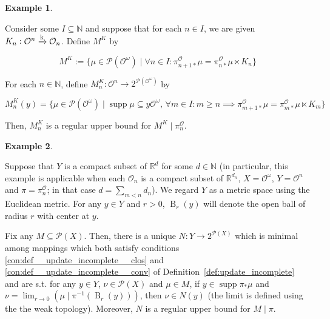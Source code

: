 \documentclass[11pt]{article}
\theoremstyle{definition}
\newtheorem{example}{Example}%
\theoremstyle{plain}
\newcommand{\Nats}{\mathbb{N}}
\newcommand{\Reals}{\mathbb{R}}
\newcommand{\B}{\operatorname{B}}
\newcommand{\M}{\xrightarrow{\textnormal{k}}}
\newcommand{\PM}{\mathcal{P}}
\DeclareMathOperator{\Sp}{supp}
\newcommand{\Ob}{\mathcal{O}}
\newcommand{\OO}{\Ob^\omega}
\newcommand{\PO}{\pi^\Ob}
\newcommand{\PMO}{\PM(\OO)}
\begin{document}
%
\begin{samepage}
\begin{example}
\label{exm:update_incomplete_kernels}

Consider some $I \subseteq \Nats$ and suppose that for each $n \in I$, we are given $K_n: \Ob^n \M \Ob_n$. Define $M^K$ by

\begin{equation}
M^K:=\{\mu \in \PMO \mid \forall n \in I: \PO_{n+1*}\mu = \PO_{n*}\mu \ltimes K_n\}
\end{equation}

For each $n \in \Nats$, define $M^K_n: \Ob^n \rightarrow 2^{\PMO}$ by

\begin{equation}
M^K_n(y) = \{\mu \in \PMO \mid \Sp{\mu} \subseteq y\OO,\, \forall m \in I: m \geq n \implies \PO_{m+1*}\mu = \PO_{m*}\mu \ltimes K_m\}
\end{equation}

Then, $M^K_n$ is a regular upper bound for $M^K \mid \PO_n$.

\end{example}
\end{samepage}

\begin{samepage}
\begin{example}
\label{exm:update_incomplete_euclid}

Suppose that $Y$ is a compact subset of $\Reals^{d}$ for some $d \in \Nats$ (in particular, this example is applicable when each $\Ob_n$ is a compact subset of $\Reals^{d_n}$, $X=\OO$, $Y=\Ob^n$ and $\pi=\PO_n$; in that case $d=\sum_{m < n} d_n$). We regard $Y$ as a metric space using the Euclidean metric. For any $y \in Y$ and $r > 0$, $\B_r\left(y\right)$ will denote the open ball of radius $r$ with center at $y$. 

Fix any $M \subseteq \PM(X)$. Then, there is a unique $N: Y \rightarrow 2^{\PM(X)}$ which is minimal among mappings which both satisfy conditions \ref{con:def__update_incomplete__clos} and \ref{con:def__update_incomplete__conv} of Definition~\ref{def:update_incomplete} and are s.t. for any $y \in Y$, $\nu \in \PM(X)$ and $\mu \in M$, if $y \in \Sp \pi_*\mu$ and $\nu = \lim_{r \rightarrow 0}{\left(\mu \mid \pi^{-1}\left(\B_r\left(y\right)\right)\right)}$, then $\nu \in N(y)$ (the limit is defined using the the weak topology). Moreover, $N$ is a regular upper bound for $M \mid \pi$.

\end{example}
\end{samepage}
\end{document}
